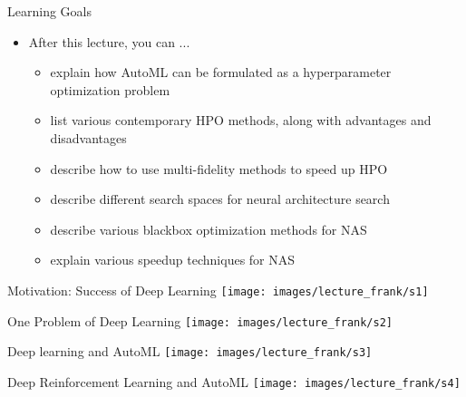 \begin{frame}[c]{Learning Goals}

\begin{itemize}
	\item After this lecture, you can ...
	\begin{itemize}
		\item explain how AutoML can be formulated as a hyperparameter
		optimization problem
		\item list various contemporary HPO methods, along with advantages
		and disadvantages
		\item describe how to use multi-fidelity methods to speed up HPO
		\item describe different search spaces for neural architecture search
		\item describe various blackbox optimization methods for NAS
		\item explain various speedup techniques for NAS
	\end{itemize}
\end{itemize}
\end{frame}
{
\begin{frame}[c]{Motivation: Success of Deep Learning}
\centering
\texttt{[image: images/lecture\_frank/s1]}
\end{frame}
}
\begin{frame}[c]{One Problem of Deep Learning}
\centering
\texttt{[image: images/lecture\_frank/s2]}
\end{frame}
{
	\begin{frame}[c]{Deep learning and AutoML}
	\centering
	\texttt{[image: images/lecture\_frank/s3]}
\end{frame}
}
{
\begin{frame}[c]{Deep Reinforcement Learning and AutoML}
\centering
\texttt{[image: images/lecture\_frank/s4]}
\end{frame}
}
